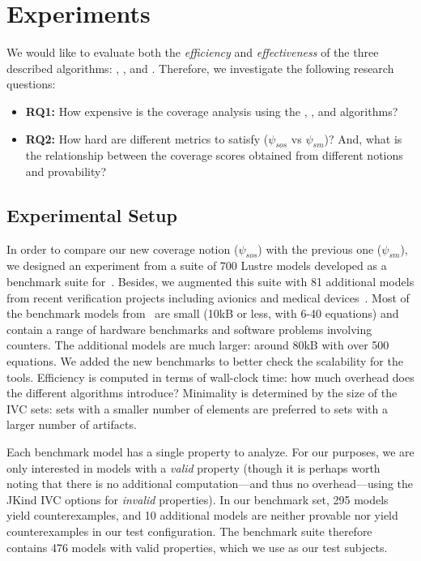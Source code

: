 \section{Experiments}
\label{sec:experiments}

We would like to evaluate both the {\em efficiency} and {\em
  effectiveness} of the three described algorithms: \ucbfalg, \ucalg, and \mustalg. Therefore, we investigate the following research questions:
\begin{itemize}
    \item \textbf{RQ1:} How expensive is the coverage analysis using the \ucalg, \mustalg, and \ucbfalg algorithms?
    \item \textbf{RQ2:} How hard are different metrics to satisfy ($\psi_{sos}$ vs $\psi_{sm}$)?  And, what is the relationship between the coverage scores obtained from different notions and provability?
\end{itemize}

\subsection{Experimental Setup}

In order to compare our new coverage notion ($\psi_{sos}$) with the previous one ($\psi_{sm}$), we designed an experiment from a suite of 700 Lustre models developed
as a benchmark suite for~\cite{Hagen08:FMCAD}. Besides, we augmented this suite
with 81 additional models from recent verification projects including
avionics and medical devices~\cite{QFCS15:backes,hilt2013}. Most of
the benchmark models from~\cite{Hagen08:FMCAD} are small (10kB or less,
with 6-40 equations) and contain a range of hardware benchmarks and
software problems involving counters. The additional models are much
larger: around 80kB with over 500 equations. We added the new
benchmarks to better check the scalability for the tools. Efficiency is computed in terms of wall-clock time: how
much overhead does the different algorithms introduce? Minimality is
determined by the size of the IVC sets: sets with a smaller number of
elements are preferred to sets with a larger number of artifacts.

Each benchmark model has a single property to analyze.  For our purposes, we are only interested in models with a {\em valid} property (though it is perhaps worth noting that there is no additional computation---and thus no overhead---using the JKind IVC options for {\em invalid} properties).  In our benchmark set, 295 models yield counterexamples, and 10 additional models are neither provable nor yield counterexamples in our test configuration.  The benchmark suite therefore contains 476 models with valid properties, which we use as our test subjects.

